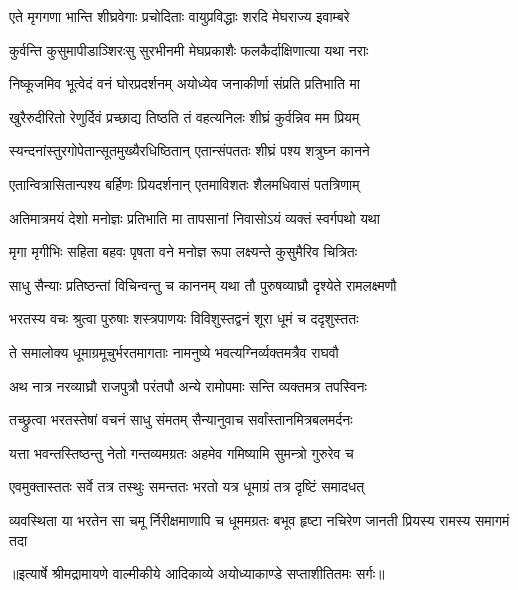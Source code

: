 \twolineshloka
{एते मृगगणा भान्ति शीघ्रवेगाः प्रचोदिताः}
{वायुप्रविद्धाः शरदि मेघराज्य इवाम्बरे} %

\twolineshloka
{कुर्वन्ति कुसुमापीडाञ्शिरःसु सुरभीनमी}
{मेघप्रकाशैः फलकैर्दाक्षिणात्या यथा नराः} %

\twolineshloka
{निष्कूजमिव भूत्वेदं वनं घोरप्रदर्शनम्}
{अयोध्येव जनाकीर्णा संप्रति प्रतिभाति मा} %

\twolineshloka
{खुरैरुदीरितो रेणुर्दिवं प्रच्छाद्य तिष्ठति}
{तं वहत्यनिलः शीघ्रं कुर्वन्निव मम प्रियम्} %

\twolineshloka
{स्यन्दनांस्तुरगोपेतान्सूतमुख्यैरधिष्ठितान्}
{एतान्संपततः शीघ्रं पश्य शत्रुघ्न कानने} %

\twolineshloka
{एतान्वित्रासितान्पश्य बर्हिणः प्रियदर्शनान्}
{एतमाविशतः शैलमधिवासं पतत्रिणाम्} %

\twolineshloka
{अतिमात्रमयं देशो मनोज्ञः प्रतिभाति मा}
{तापसानां निवासोऽयं व्यक्तं स्वर्गपथो यथा} %

\twolineshloka
{मृगा मृगीभिः सहिता बहवः पृषता वने}
{मनोज्ञ रूपा लक्ष्यन्ते कुसुमैरिव चित्रितः} %

\twolineshloka
{साधु सैन्याः प्रतिष्ठन्तां विचिन्वन्तु च काननम्}
{यथा तौ पुरुषव्याघ्रौ दृश्येते रामलक्ष्मणौ} %

\twolineshloka
{भरतस्य वचः श्रुत्वा पुरुषाः शस्त्रपाणयः}
{विविशुस्तद्वनं शूरा धूमं च ददृशुस्ततः} %

\twolineshloka
{ते समालोक्य धूमाग्रमूचुर्भरतमागताः}
{नामनुष्ये भवत्यग्निर्व्यक्तमत्रैव राघवौ} %

\twolineshloka
{अथ नात्र नरव्याघ्रौ राजपुत्रौ परंतपौ}
{अन्ये रामोपमाः सन्ति व्यक्तमत्र तपस्विनः} %

\twolineshloka
{तच्छ्रुत्वा भरतस्तेषां वचनं साधु संमतम्}
{सैन्यानुवाच सर्वांस्तानमित्रबलमर्दनः} %

\twolineshloka
{यत्ता भवन्तस्तिष्ठन्तु नेतो गन्तव्यमग्रतः}
{अहमेव गमिष्यामि सुमन्त्रो गुरुरेव च} %

\twolineshloka
{एवमुक्तास्ततः सर्वे तत्र तस्थुः समन्ततः}
{भरतो यत्र धूमाग्रं तत्र दृष्टिं समादधत्} %

\fourlineindentedshloka
{व्यवस्थिता या भरतेन सा चमू}
{र्निरीक्षमाणापि च धूममग्रतः}
{बभूव हृष्टा नचिरेण जानती}
{ प्रियस्य रामस्य समागमं तदा} %


{॥इत्यार्षे श्रीमद्रामायणे वाल्मीकीये आदिकाव्ये अयोध्याकाण्डे सप्ताशीतितमः सर्गः॥}

